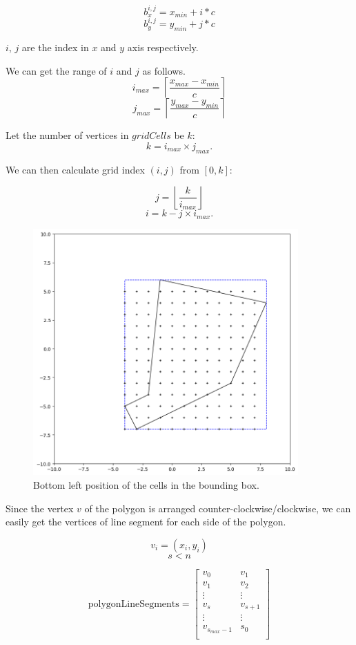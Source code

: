 $$b^{i,j}_x = x_{min} + i * c$$
$$b^{i,j}_y = y_{min} + j * c$$

$i$, $j$ are the index in $x$  and $y$ axis respectively.


We can get the range of $i$ and $j$ as follows.
$$i_{max} = \left\lceil\frac{x_{max} - x_{min}}{c}\right\rceil $$
$$j_{max} = \left\lceil\frac{y_{max} - y_{min}}{c}\right\rceil$$

Let the number of vertices in $gridCells$ be $k$:
$$ k = i_{max} \times j_{max}.$$


We can then calculate grid index $(i,j)$ from $[0, k]$:

$$j = \left\lfloor\frac{k}{i_{max}}\right\rfloor$$
$$i = k  - j \times i_{max}.$$

\begin{figure} \label{fig:pegasus-planner-generate-cells}
  \centering
  \includegraphics[width=4in]{figures/methodology/pegasus_planner/generate_grid/cells}
  \caption[Cells in the Bounding Box]{\small Bottom left position of the cells in the bounding box.}
\end{figure}

Since the vertex $v$ of the polygon is arranged counter-clockwise/clockwise, we can easily get the vertices of line segment for each side of the polygon.

$$v_i = (x_i, y_i)$$
$$s < n$$

$$\text{polygonLineSegments}=\begin{bmatrix}
  v_0 & v_1 \\
  v_1 & v_2 \\
  \vdots & \vdots \\
  v_s & v_{s+1} \\
  \vdots & \vdots \\
  v_{s_{max}-1} & s_0 \\
\end{bmatrix}$$

